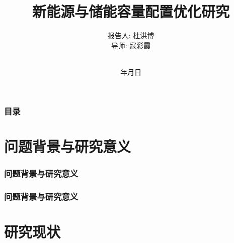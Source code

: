 \documentclass{beamer}
\renewcommand{\today}{\number\year 年\number\month 月\number\day 日}
\begin{document}
\title[新能源与储能容量配置优化研究]%
{新能源与储能容量配置优化研究}

\author[杜洪博]%
{报告人: 杜洪博\\
导\quad 师: 寇彩霞\rule[0pt]{0pt}{20pt}\\}

\institute[BUPT]{\textcolor[rgb]{0.0,0.0,0.10}%
{\small\ttfamily 北京邮电大学\ 理学院\\[10pt]}}

\date{\today}

\begin{frame}[plain]
	\titlepage
\end{frame}

\begin{frame}
	\frametitle{目录}
	\tableofcontents[hideallsubsections] %
\end{frame}

\AtBeginSection[] %
{ \begin{frame}<beamer> %
		\tableofcontents[currentsection,hideallsubsections]%
	\end{frame}
}





\section{问题背景与研究意义}

\begin{frame}
	\frametitle{问题背景与研究意义} 
	
\end{frame}

\begin{frame}
	\frametitle{问题背景与研究意义} 

\end{frame}

\section{研究现状}
\end{document}
